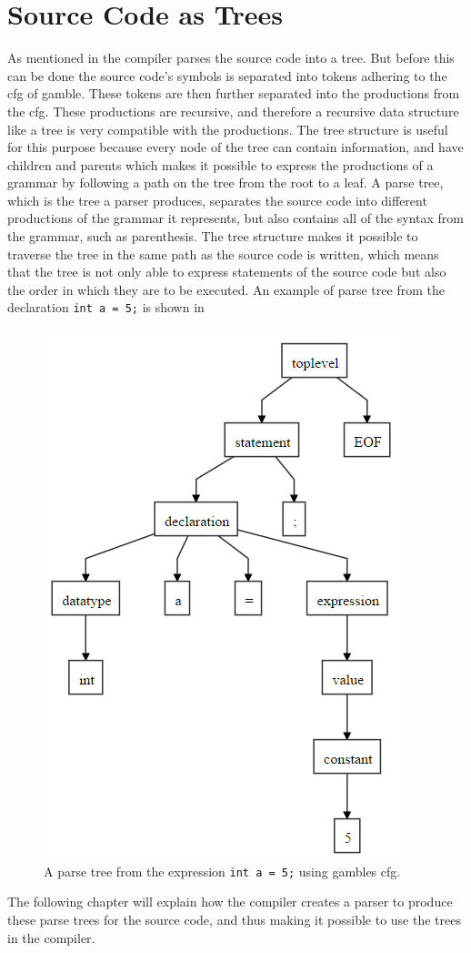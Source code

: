 \section{Source Code as Trees}\label{SourceCodeAsTrees}
As mentioned in  the compiler parses the source code into a tree.
But before this can be done the source code's symbols is separated into tokens adhering to the \acrshort{cfg} of \gls{gamble}.
These tokens are then further separated into the productions from the \acrshort{cfg}. 
These productions are recursive, and therefore a recursive data structure like a tree is very compatible with the productions.
The tree structure is useful for this purpose because every node of the tree can contain information, and have children and parents which makes it possible to express the productions of a grammar by following a path on the tree from the root to a leaf.
A parse tree, which is the tree a parser produces, separates the source code into different productions of the grammar it represents, but also contains all of the syntax from the grammar, such as parenthesis.
The tree structure makes it possible to traverse the tree in the same path as the source code is written, which means that the tree is not only able to express statements of the source code but also the order in which they are to be executed.
An example of parse tree from the declaration \texttt{int a = 5;} is shown in 

\begin{figure}
    \centering
    \includegraphics[width=0.5\linewidth]{figures/Trees/PST.PNG}
    \caption{A parse tree from the expression \texttt{int a = 5;} using \glspl{gamble} \acrshort{cfg}.}\label{image:PST}
\end{figure}

The following chapter will explain how the compiler creates a parser to produce these parse trees for the source code, and thus making it possible to use the trees in the compiler.
